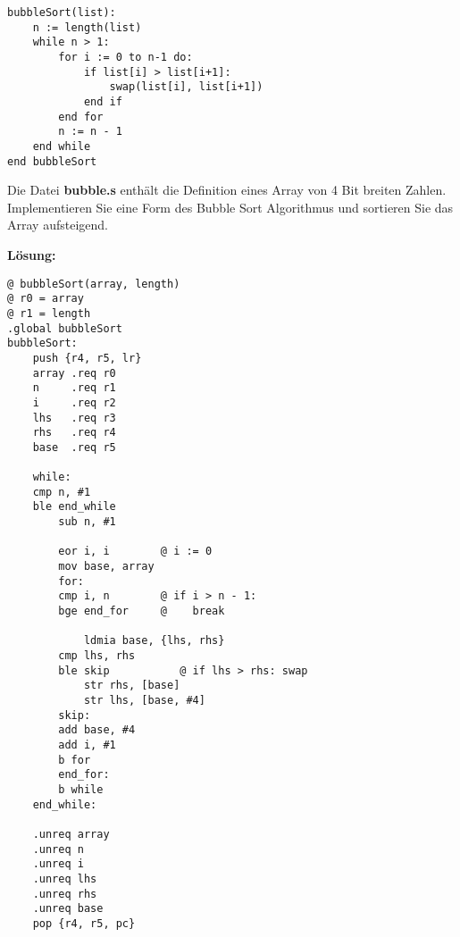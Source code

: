\documentclass[12pt]{article}
\begin{document}
\begin{lstlisting}
bubbleSort(list):
	n := length(list)
	while n > 1:
		for i := 0 to n-1 do:
			if list[i] > list[i+1]:
				swap(list[i], list[i+1])
			end if
		end for
		n := n - 1
	end while
end bubbleSort
\end{lstlisting}

Die Datei \textbf{bubble.s} enthält die Definition eines Array von 4 Bit breiten Zahlen.
Implementieren Sie eine Form des Bubble Sort Algorithmus und sortieren Sie
das Array aufsteigend.

\textbf{Lösung:}
\begin{lstlisting}
@ bubbleSort(array, length)
@ r0 = array
@ r1 = length
.global bubbleSort
bubbleSort:
	push {r4, r5, lr}
	array .req r0
	n     .req r1
	i     .req r2
	lhs   .req r3
	rhs   .req r4
	base  .req r5
	
	while:
	cmp n, #1
	ble end_while
	    sub n, #1

	    eor i, i		@ i := 0
	    mov base, array
	    for:
	    cmp i, n		@ if i > n - 1:
	    bge end_for		@    break
	    
	        ldmia base, {lhs, rhs}
		cmp lhs, rhs
		ble skip		   @ if lhs > rhs: swap
		    str rhs, [base]		
		    str lhs, [base, #4]
		skip:
		add base, #4
		add i, #1
		b for
	    end_for:
	    b while
	end_while:
	
	.unreq array
	.unreq n
	.unreq i
	.unreq lhs
	.unreq rhs
	.unreq base
	pop {r4, r5, pc}
\end{lstlisting}
\end{document}

